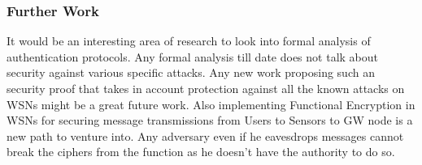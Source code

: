 \documentclass[a4paper,12pt]{report}
\begin{document}
\subsubsection{Further Work}
It would be an interesting area of research to look into formal
analysis of authentication protocols. Any formal analysis till date
does not talk about security against various specific attacks. Any
new work proposing such an security proof that takes in account
protection against all the known attacks on WSNs might be a great
future work. Also implementing Functional Encryption in WSNs for
securing message transmissions from Users to Sensors to GW node is a
new path to venture into. Any adversary even if he eavesdrops
messages cannot break the ciphers from the function as he doesn't
have the authority to do so.








\end{document}
